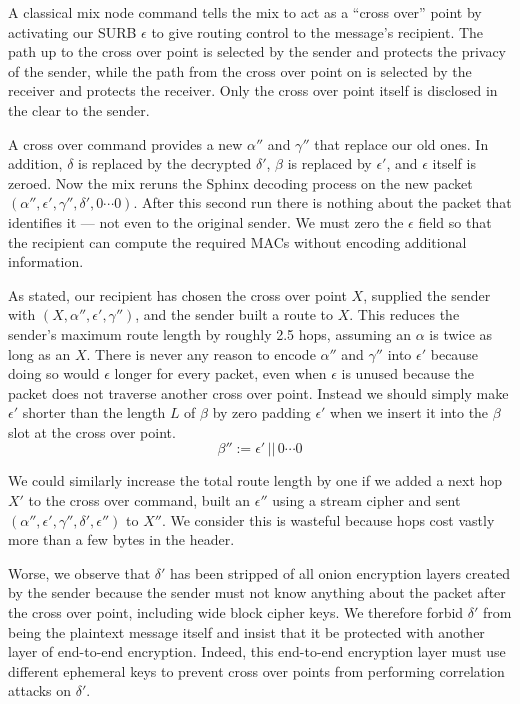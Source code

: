 \documentclass[twoside,letterpaper]{llncs}
\begin{document}
A classical mix node command tells the mix to act as a ``cross over''
point by activating our SURB $\epsilon$ to give routing control to
the message's recipient.  The path up to the cross over point
is selected by the sender and protects the privacy of the sender,
while the path from the cross over point on is selected by the
receiver and protects the receiver.  Only the cross over point
itself is disclosed in the clear to the sender.

A cross over command provides a new
 $\alpha''$ and $\gamma''$ that replace our old ones.  
In addition, $\delta$ is replaced by the decrypted $\delta'$, 
$\beta$ is replaced by $\epsilon'$, and $\epsilon$ itself is zeroed.
Now the mix reruns the Sphinx decoding process on the new packet
$(\alpha'',\epsilon',\gamma'',\delta',0\cdots0)$.  
After this second run there is nothing about the packet that 
identifies it --- not even to the original sender.
We must zero the $\epsilon$ field so that the recipient can compute
the required MACs without encoding additional information. 

As stated, our recipient has chosen the cross over point $X$,
supplied the sender with $(X,\alpha'',\epsilon',\gamma'')$,
and the sender built a route to $X$.  This reduces the sender's
maximum route length by roughly 2.5 hops, assuming an $\alpha$
is twice as long as an $X$.  There is never any reason to encode
$\alpha''$ and $\gamma''$ into $\epsilon'$ because doing so would
$\epsilon$ longer for every packet, even when $\epsilon$ is unused
because the packet does not traverse another cross over point.
Instead we should simply make $\epsilon'$ shorter than the length
$L$ of $\beta$ by zero padding $\epsilon'$ when we insert it into
the $\beta$ slot at the cross over point.
$$ \beta'' := \epsilon' \,||\, 0\cdots0 $$

We could similarly increase the total route length by one if
we added a next hop $X'$ to the cross over command, built an
$\epsilon''$ using a stream cipher and sent
 $(\alpha'',\epsilon',\gamma'',\delta',\epsilon'')$ to $X''$.
We consider this is wasteful because hops cost vastly more than
a few bytes in the header.

Worse, we observe that $\delta'$ has been stripped of all onion
encryption layers created by the sender because the sender must not
know anything about the packet after the cross over point,
 including wide block cipher keys.
We therefore forbid $\delta'$ from being the plaintext message itself
and insist that it be protected with another layer of end-to-end
encryption.  Indeed, this end-to-end encryption layer must use
different ephemeral keys to prevent cross over points from performing
correlation attacks on $\delta'$.
\end{document}
